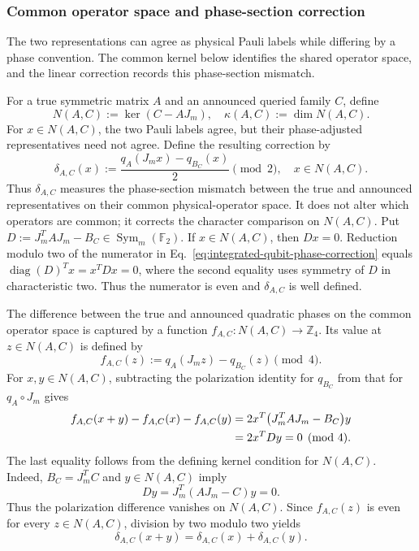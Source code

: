 \documentclass[11pt]{article}
\newcommand{\F}{\mathbb F}
\newcommand{\Sym}{\operatorname{Sym}}
\newcommand{\1}{\mathbf 1}
\theoremstyle{plain}
\theoremstyle{definition}
\theoremstyle{remark}
\begin{document}
\subsubsection{Common operator space and phase-section correction}
\label{subsubsec:qubit-common-space-phase-correction}

The two representations can agree as physical Pauli labels while differing by
a phase convention. The common kernel below identifies the shared operator space, and the linear correction records this phase-section mismatch.

For a true symmetric matrix $A$ and an announced queried family $C$, define
\begin{equation}
 N(A,C):=\ker(C-AJ_m),
 \quad
 \kappa(A,C):=\dim N(A,C).
 \label{eq:integrated-qubit-compatibility-space}
\end{equation}
For $x\in N(A,C)$, the two Pauli labels agree, but their phase-adjusted
representatives need not agree.  Define the resulting correction by
\begin{equation}
 \delta_{A,C}(x)
 :=\frac{q_A(J_mx)-q_{B_C}(x)}2\pmod2,
 \quad x\in N(A,C).
 \label{eq:integrated-qubit-phase-correction}
\end{equation}
Thus $\delta_{A,C}$ measures the phase-section mismatch between the true and
announced representatives on their common physical-operator space.  It does
not alter which operators are common; it corrects the character comparison on
$N(A,C)$.
Put $D:=J_m^TAJ_m-B_C\in\Sym_m(\F_2)$.  If $x\in N(A,C)$, then
$Dx=0$.  Reduction modulo two of the numerator in
Eq.~\eqref{eq:integrated-qubit-phase-correction} equals
$\operatorname{diag}(D)^Tx=x^TDx=0$, where the second equality uses symmetry
of $D$ in characteristic two.  Thus the numerator is even and
$\delta_{A,C}$ is well defined.

The difference between the true and announced quadratic phases on the common
operator space is captured by a function $f_{A,C}:N(A,C)\to\mathbb Z_4$.
Its value at $z\in N(A,C)$ is defined by
\[
f_{A,C}(z):=q_A(J_mz)-q_{B_C}(z)\pmod 4.
\]
For $x,y\in N(A,C)$, subtracting the polarization identity
for $q_{B_C}$ from that for $q_A\circ J_m$ gives
\begin{align}
f_{A,C}(x+y)-f_{A,C}(x)-f_{A,C}(y)
&=2x^T\bigl(J_m^TAJ_m-B_C\bigr)y \notag\\
&=2x^TDy
=0\pmod4.
\label{eq:integrated-qubit-delta-additivity-calculation}
\end{align}
The last equality follows from the defining kernel condition for $N(A,C)$.
Indeed, $B_C=J_m^TC$ and $y\in N(A,C)$ imply
\[
Dy=J_m^T(AJ_m-C)y=0.
\]
Thus the polarization difference vanishes on $N(A,C)$.
Since $f_{A,C}(z)$ is even for every $z\in N(A,C)$,
division by two modulo two yields
\[
\delta_{A,C}(x+y)
=\delta_{A,C}(x)+\delta_{A,C}(y).
\]
\end{document}
